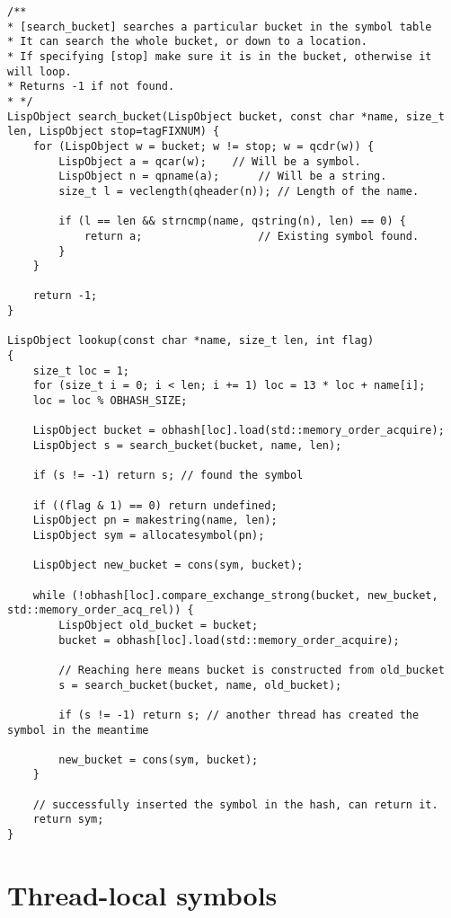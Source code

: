 \begin{code}
\begin{verbatim}
/**
* [search_bucket] searches a particular bucket in the symbol table
* It can search the whole bucket, or down to a location.
* If specifying [stop] make sure it is in the bucket, otherwise it will loop.
* Returns -1 if not found.
* */
LispObject search_bucket(LispObject bucket, const char *name, size_t len, LispObject stop=tagFIXNUM) {
    for (LispObject w = bucket; w != stop; w = qcdr(w)) {
        LispObject a = qcar(w);    // Will be a symbol.
        LispObject n = qpname(a);      // Will be a string.
        size_t l = veclength(qheader(n)); // Length of the name.

        if (l == len && strncmp(name, qstring(n), len) == 0) {
            return a;                  // Existing symbol found.
        }
    }

    return -1;
}

LispObject lookup(const char *name, size_t len, int flag)
{
    size_t loc = 1;
    for (size_t i = 0; i < len; i += 1) loc = 13 * loc + name[i];
    loc = loc % OBHASH_SIZE;

    LispObject bucket = obhash[loc].load(std::memory_order_acquire);
    LispObject s = search_bucket(bucket, name, len);

    if (s != -1) return s; // found the symbol

    if ((flag & 1) == 0) return undefined;
    LispObject pn = makestring(name, len);
    LispObject sym = allocatesymbol(pn);

    LispObject new_bucket = cons(sym, bucket);

    while (!obhash[loc].compare_exchange_strong(bucket, new_bucket, std::memory_order_acq_rel)) {
        LispObject old_bucket = bucket;
        bucket = obhash[loc].load(std::memory_order_acquire);

        // Reaching here means bucket is constructed from old_bucket
        s = search_bucket(bucket, name, old_bucket);

        if (s != -1) return s; // another thread has created the symbol in the meantime

        new_bucket = cons(sym, bucket);
    }

    // successfully inserted the symbol in the hash, can return it.
    return sym;
}
\end{verbatim}
\end{code}

\section{Thread-local symbols}
\label{sec:threadlocal-code}

